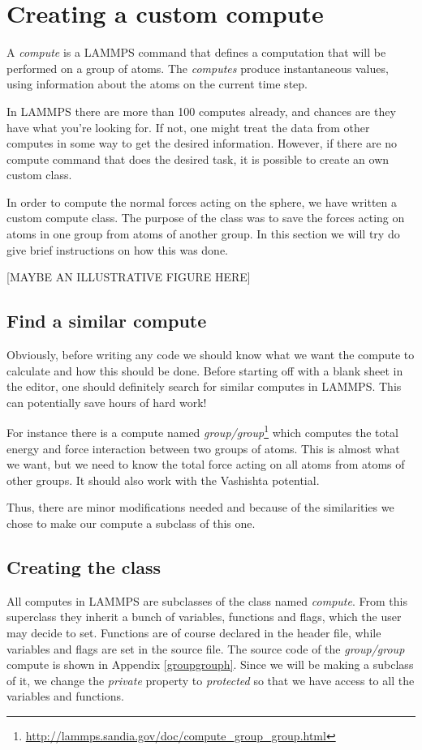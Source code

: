 \documentclass[twoside,english]{uiofysmaster}
\begin{document}
\section{Creating a custom compute}
A \textit{compute} is a LAMMPS command that defines a computation that will be performed on a group of atoms. The \textit{computes} produce instantaneous values, using information about the atoms on the current time step. 

In LAMMPS there are more than 100 computes already, and chances are they have what you're looking for. If not, one might treat the data from other computes in some way to get the desired information. However, if there are no compute command that does the desired task, it is possible to create an own custom class.  

In order to compute the normal forces acting on the sphere, we have written a custom compute class. The purpose of the class was to save the forces acting on atoms in one group from atoms of another group. In this section we will try do give brief instructions on how this was done.

{\color{editColor}[MAYBE AN ILLUSTRATIVE FIGURE HERE]}

\subsection{Find a similar compute}
Obviously, before writing any code we should know what we want the compute to calculate and how this should be done. 
Before starting off with a blank sheet in the editor, one should definitely search for similar computes in LAMMPS. This can potentially save hours of hard work!

For instance there is a compute named \textit{group/group}\footnote{\href{http://lammps.sandia.gov/doc/compute_group_group.html}{http://lammps.sandia.gov/doc/compute\_group\_group.html}} which computes the total energy and force interaction between two groups of atoms. 
This is almost what we want, but we need to know the total force acting on all atoms from atoms of other groups. {\color{editColor}It should also work with the Vashishta potential.}

Thus, there are minor modifications needed and because of the similarities we chose to make our compute a subclass of this one.


\subsection{Creating the class}
All computes in LAMMPS are subclasses of the class named  \textit{compute}. From this superclass they inherit a bunch of variables, functions and flags, which the user may decide to set. Functions are of course declared in the header file, while variables and flags are set in the source file. The source code of the \textit{group/group} compute is shown in Appendix \ref{groupgrouph}. Since we will be making a subclass of it, we change the \textit{private} property to \textit{protected} so that we have access to all the variables and functions.
\end{document}
